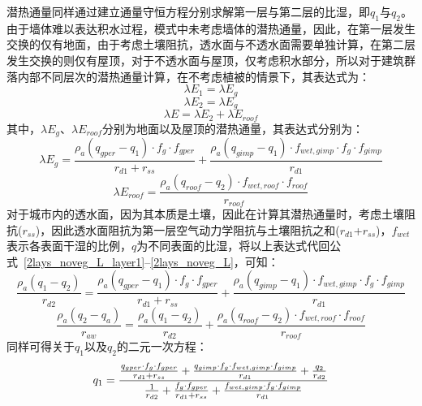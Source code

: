 潜热通量同样通过建立通量守恒方程分别求解第一层与第二层的比湿，即$q_1$与$q_2$。由于墙体难以表达积水过程，模式中未考虑墙体的潜热通量，因此，在第一层发生交换的仅有地面，由于考虑土壤阻抗，透水面与不透水面需要单独计算，在第二层发生交换的则仅有屋顶，对于不透水面与屋顶，仅考虑积水部分，所以对于建筑群落内部不同层次的潜热通量计算，在不考虑植被的情景下，其表达式为：
\begin{equation}\label{2lays_noveg_L_layer1}
    \lambda E_{1} = \lambda E_{g}
\end{equation}
%
\begin{equation}
    \lambda E_{2} = \lambda E_{g}
\end{equation}
%
\begin{equation}\label{2lays_noveg_L}
    \lambda E = \lambda E_{2} + \lambda E_{roof}
\end{equation}
其中，$\lambda E_{g}$、$\lambda E_{roof}$分别为地面以及屋顶的潜热通量，其表达式分别为：
\begin{equation}\label{urban_noveg_Eg}
    \lambda E_{g} = \frac{\rho _a \left( q_{gper}-q_{1} \right) \cdot f_{g} \cdot f_{gper}}{r_{d1}+r_{ss}} + \frac{\rho _a \left( q_{gimp}-q_{1} \right) \cdot f_{wet,gimp} \cdot f_{g} \cdot f_{gimp}}{r_{d1}}
\end{equation}
%
\begin{equation}\label{urban_noveg_Eroof}
    \lambda E_{roof} = \frac{\rho _a \left( q_{roof}-q_{2}\right) \cdot f_{wet,roof} \cdot f_{roof}}{r_{roof}}
\end{equation}
对于城市内的透水面，因为其本质是土壤，因此在计算其潜热通量时，考虑土壤阻抗($r_{ss}$)，因此透水面阻抗为第一层空气动力学阻抗与土壤阻抗之和($r_{d1}$+$r_{ss}$)，$f_{wet}$表示各表面干湿的比例，$q$为不同表面的比湿，将以上表达式代回公式~\eqref{2lays_noveg_L_layer1}--\eqref{2lays_noveg_L}，可知：
\begin{equation}
    \frac{\rho _a \left( q_{1}-q_{2}\right)}{r_{d2}} =
    \frac{\rho _a \left( q_{gper}-q_{1}\right) \cdot f_{g} \cdot f_{gper}}{r_{d1}+r_{ss}} + \frac{\rho _a \left( q_{gimp}-q_{1} \right) \cdot f_{wet,gimp} \cdot f_{g} \cdot f_{gimp}}{r_{d1}}
\end{equation}
%
\begin{equation}
    \frac{\rho _a \left( q_{2} - q_a\right)}{r_{aw}} = \frac{\rho _a \left( q_{1} - q_{2}\right)}{r_{d2}} + \frac{\rho _a \left( q_{roof}-q_{2}\right) \cdot f_{wet,roof} \cdot f_{roof}}{r_{roof}}
\end{equation}
同样可得关于$q_{1}$以及$q_{2}$的二元一次方程：
\begin{equation}
    q_{1} = \\
    \frac{\frac{q_{gper} \cdot f_{g} \cdot f_{gper}}{r_{d1} + r_{ss}} + \frac{q_{gimp} \cdot f_{g} \cdot f_{wet,gimp} \cdot f_{gimp}}{r_{d1}} + \frac{q_{2}}{r_{d2}}}{\frac{1}{r_{d2}} + \frac{f_{g} \cdot f_{gper}}{r_{d1} + r_{ss}} + \frac{f_{wet,gimp} \cdot f_{g} \cdot f_{gimp}}{r_{d1}}}
\end{equation}
